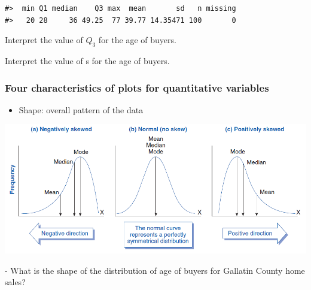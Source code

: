 \documentclass[
]{report}
\newenvironment{Shaded}{\begin{snugshade}}{\end{snugshade}}
\newcommand{\FunctionTok}[1]{\textcolor[rgb]{0.13,0.29,0.53}{\textbf{#1}}}
\newcommand{\NormalTok}[1]{#1}
\newcommand{\SpecialCharTok}[1]{\textcolor[rgb]{0.81,0.36,0.00}{\textbf{#1}}}
\providecommand{\tightlist}{%
  \setlength{\itemsep}{0pt}\setlength{\parskip}{0pt}}
\newcommand{\rgi}{\hspace{24pt}}  %
\begin{document}
\begin{Shaded}
\end{Shaded}

\begin{verbatim}
#>  min Q1 median    Q3 max  mean       sd   n missing
#>   20 28     36 49.25  77 39.77 14.35471 100       0
\end{verbatim}

Interpret the value of \(Q_3\) for the age of buyers.

\vspace{0.5in}

Interpret the value of s for the age of buyers.

\vspace{0.5in}

\newpage

\subsubsection*{Four characteristics of plots for quantitative variables}\label{four-characteristics-of-plots-for-quantitative-variables}

\begin{itemize}
\tightlist
\item
  Shape: overall pattern of the data
\end{itemize}

\begin{center}\includegraphics[width=0.8\linewidth]{images/shape2} \end{center}

\rgi \rgi - What is the shape of the distribution of age of buyers for Gallatin County home sales?

\vspace{0.3in}
\end{document}
